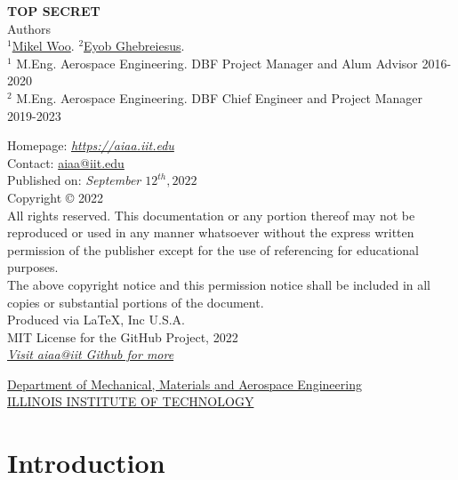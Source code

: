 \documentclass[report]{dbf}
\begin{document}
\newpage
\newpage
\begin{center}
    \textbf{\color{white}TOP SECRET}\\[0.8in]
    \large Authors\\[.1in]
    \small{$^1$}\href{mailto:eghebreiesus@hawk.iit.edu}{Mikel Woo}. %
    \small{$^2$}\href{mailto:mwoo1@hawk.iit.edu}{Eyob Ghebreiesus}. %
    \vspace{.2in}\\
    \small{$^1$ M.Eng. Aerospace Engineering. DBF Project Manager and Alum Advisor 2016-2020 \\
    $^2$ M.Eng. Aerospace Engineering. DBF Chief Engineer and Project Manager 2019-2023}   \\[1in]
\end{center}
Homepage: \textit{\href{https://aiaa.iit.edu}{https://aiaa.iit.edu}} \\
Contact: \href{mailto:aiaa@iit.edu}{aiaa@iit.edu}\\
Published on: \textit{September $12^{th}, 2022$}\\[.2in] %
Copyright © 2022\\
All rights reserved. This documentation or any portion thereof may not be reproduced or used in any manner whatsoever without the express written permission of the publisher except for the use of referencing for educational purposes.\\
The above copyright notice and this permission notice shall be included in all copies or substantial portions of the document.\\[.2in]
Produced via LaTeX, Inc U.S.A.\\
MIT License for the GitHub Project, 2022\\
\href{https://github.com/aiaa-iit}{\textit{Visit aiaa@iit Github for more}}\\
\begin{center}
\href{https://www.iit.edu/mmae}{Department of Mechanical, Materials and Aerospace Engineering}\\
\href{https://www.iit.edu}{ILLINOIS INSTITUTE OF TECHNOLOGY}\\
\end{center}
\newpage
\hypersetup{linkcolor=black}
\tableofcontents
\newpage


\section{Introduction}\label{s:in} %
    
    
\end{document}
